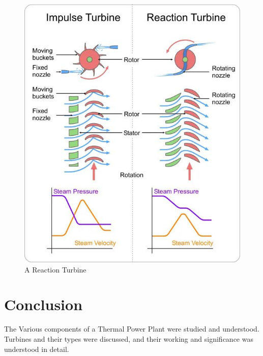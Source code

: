 \documentclass[11pt]{article}
\begin{document}
\begin{figure}[H]
	\centering
	\includegraphics[scale=0.6]{difference.jpg}
	\caption{A Reaction Turbine}
	\label{it}
\end{figure}




\section{Conclusion}
The Various components of a Thermal Power Plant were studied and understood. Turbines and their types were discussed, and their working and significance was understood in detail. 
\end{document}
